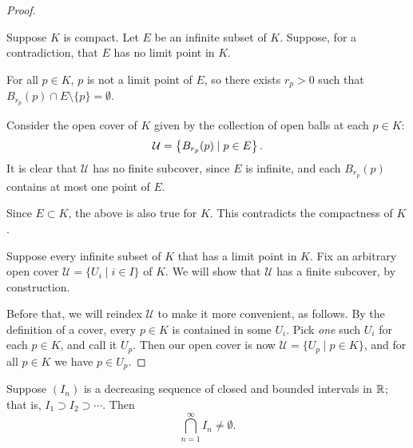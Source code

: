 \begin{proof} \

\forward Suppose $K$ is compact. Let $E$ be an infinite subset of $K$. Suppose, for a contradiction, that $E$ has no limit point in $K$.

For all $p\in K$, $p$ is not a limit point of $E$, so there exists $r_p>0$ such that $B_{r_p}(p)\cap E\setminus\{p\}=\emptyset$.

\begin{figure}[H]
\centering
{}
\end{figure}

Consider the open cover of $K$ given by the collection of open balls at each $p\in K$:
\[\mathcal{U}=\left\{B_{r_p}(p)\mid p\in E\right\}.\]
It is clear that $\mathcal{U}$ has no finite subcover, since $E$ is infinite, and each $B_{r_p}(p)$ contains at most one point of $E$.

Since $E\subset K$, the above is also true for $K$. This contradicts the compactness of $K$.

\backward Suppose every infinite subset of $K$ that has a limit point in $K$. Fix an arbitrary open cover $\mathcal{U}=\{U_i\mid i\in I\}$ of $K$. We will show that $\mathcal{U}$ has a finite subcover, by construction.

Before that, we will reindex $\mathcal{U}$ to make it more convenient, as follows. By the definition of a cover, every $p\in K$ is contained in some $U_i$. Pick \emph{one} such $U_i$ for each $p\in K$, and call it $U_p$. Then our open cover is now $\mathcal{U}=\{U_p\mid p\in K\}$, and for all $p\in K$ we have $p\in U_p$.

\end{proof}

\begin{proposition}\label{prop:nested-interval}
Suppose $(I_n)$ is a decreasing sequence of closed and bounded intervals in $\mathbb R$; that is, $I_1\supset I_2\supset\cdots$. Then
\[\bigcap_{n=1}^{\infty}I_n\neq\emptyset.\]
\end{proposition}

